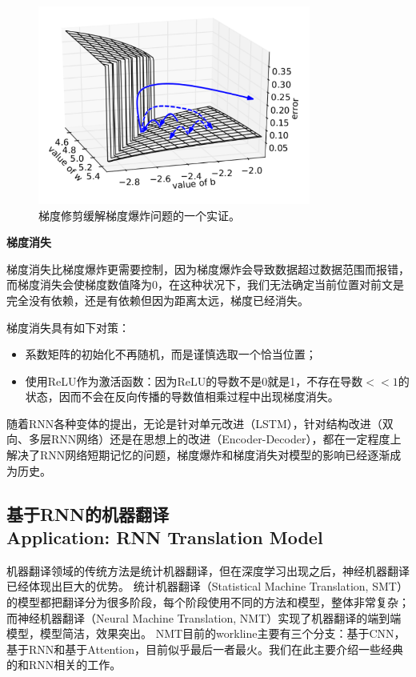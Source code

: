 \begin{figure}[!htbp]
\centering
\includegraphics[width = 0.8\textwidth]{chap-05/05-wall.png}
\caption{梯度修剪缓解梯度爆炸问题的一个实证。}
\label{05-wall}
\end{figure}

\textbf{梯度消失}

梯度消失比梯度爆炸更需要控制，因为梯度爆炸会导致数据超过数据范围而报错，而梯度消失会使梯度数值降为0，在这种状况下，我们无法确定当前位置对前文是完全没有依赖，还是有依赖但因为距离太远，梯度已经消失。

梯度消失具有如下对策：

\begin{itemize}
    \item 系数矩阵的初始化不再随机，而是谨慎选取一个恰当位置；
    \item 使用ReLU作为激活函数：因为ReLU的导数不是0就是1，不存在导数$<<1$的状态，因而不会在反向传播的导数值相乘过程中出现梯度消失。
\end{itemize}

随着RNN各种变体的提出，无论是针对单元改进（LSTM），针对结构改进（双向、多层RNN网络）还是在思想上的改进（Encoder-Decoder），都在一定程度上解决了RNN网络短期记忆的问题，梯度爆炸和梯度消失对模型的影响已经逐渐成为历史。

\subsection{基于RNN的机器翻译 \\ Application: RNN Translation Model}

机器翻译领域的传统方法是统计机器翻译，但在深度学习出现之后，神经机器翻译已经体现出巨大的优势。
统计机器翻译（Statistical Machine Translation, SMT）的模型都把翻译分为很多阶段，每个阶段使用不同的方法和模型，整体非常复杂；而神经机器翻译（Neural Machine Translation, NMT）实现了机器翻译的端到端模型，模型简洁，效果突出。
NMT目前的workline主要有三个分支：基于CNN，基于RNN和基于Attention，目前似乎最后一者最火。我们在此主要介绍一些经典的和RNN相关的工作。

